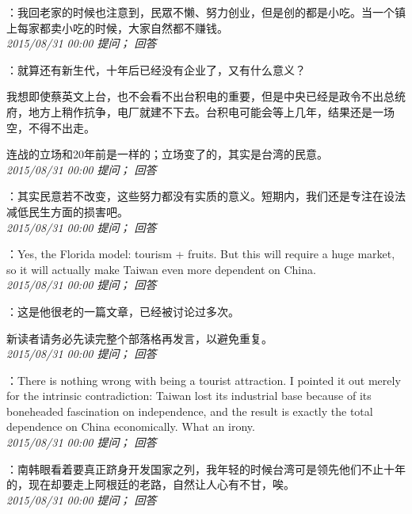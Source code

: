 \documentclass[twocolumn]{ctexart}
\begin{document}
：我回老家的时候也注意到，民眾不懒、努力创业，但是创的都是小吃。当一个镇上每家都卖小吃的时候，大家自然都不赚钱。\\

\textit{\hfill\noindent\small 2015/08/31 00:00 提问； 回答}

：就算还有新生代，十年后已经没有企业了，又有什么意义？

我想即使蔡英文上台，也不会看不出台积电的重要，但是中央已经是政令不出总统府，地方上稍作抗争，电厂就建不下去。台积电可能会等上几年，结果还是一场空，不得不出走。

连战的立场和20年前是一样的；立场变了的，其实是台湾的民意。\\

\textit{\hfill\noindent\small 2015/08/31 00:00 提问； 回答}

：其实民意若不改变，这些努力都没有实质的意义。短期内，我们还是专注在设法减低民生方面的损害吧。\\

\textit{\hfill\noindent\small 2015/08/31 00:00 提问； 回答}

：Yes, the Florida model: tourism + fruits. But this will require a huge market, so it will actually make Taiwan even more dependent on China.\\

\textit{\hfill\noindent\small 2015/08/31 00:00 提问； 回答}

：这是他很老的一篇文章，已经被讨论过多次。

新读者请务必先读完整个部落格再发言，以避免重复。\\

\textit{\hfill\noindent\small 2015/08/31 00:00 提问； 回答}

：There is nothing wrong with being a tourist attraction. I pointed it out merely for the intrinsic contradiction: Taiwan lost its industrial base because of its boneheaded fascination on independence, and the result is exactly the total dependence on China economically. What an irony.\\

\textit{\hfill\noindent\small 2015/08/31 00:00 提问； 回答}

：南韩眼看着要真正跻身开发国家之列，我年轻的时候台湾可是领先他们不止十年的，现在却要走上阿根廷的老路，自然让人心有不甘，唉。\\

\textit{\hfill\noindent\small 2015/08/31 00:00 提问； 回答}
\end{document}
